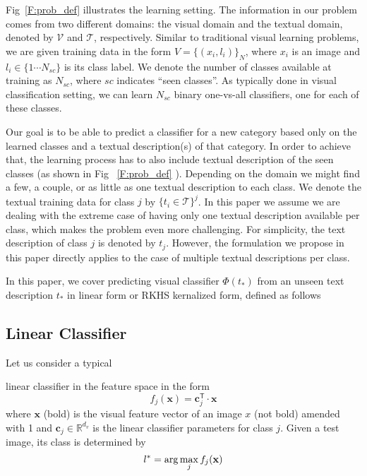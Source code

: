 

Fig~\ref{F:prob_def} illustrates the learning setting. 
The information in our problem comes from two different domains: the visual domain  and the textual domain, denoted by $\mathcal{V}$ and $\mathcal{T}$, respectively. Similar to traditional visual learning problems, we are given training data in the form $V=\{({x}_i , l_i)\}_{N}$, where $x_i$ is an image and $l_i \in \{1\cdots N_{sc}\}$ is its class label. We denote the number of classes available at training as $N_{sc}$, where $sc$ indicates ``seen classes''. As typically done in visual classification setting, we can learn $N_{sc}$ binary one-vs-all classifiers, one for each of these classes.  

Our goal is to be able to predict a classifier for a new category based only on the learned classes and a textual description(s) of that category. In order to achieve that, the learning process has to also include textual description of the seen classes (as shown in Fig ~\ref{F:prob_def} ). Depending on the domain we might find a few, a couple, or as little as one textual description to each class. We denote the textual training data for class $j$ by $\{t_i\in \mathcal{T} \}^j$. 
In this paper we assume we are dealing with the extreme case of having only one textual description available per class, which makes the problem even more challenging. For simplicity, the text description of class $j$ is denoted by $t_j$. However, the formulation we propose in this paper directly applies to the case of multiple textual descriptions per class.



In this paper, we cover predicting  visual classifier ${\Phi}(t_*)$ from an unseen text description $t_*$  in  linear form or RKHS kernalized form, defined as follows 


\subsection{Linear Classifier}
\label{sec_lin_pdef}
Let us consider a typical linear classifier in the feature space in the form
\[
    f_j(\mathbf{x}) = \mathbf{c}_j^\textsf{T} \cdot \mathbf{x}
\] 
where $\mathbf{x}$ (bold) is the visual feature vector of an image $x$ (not bold) amended with 1   and $\mathbf{c}_j \in \mathbb{R}^{d_v}$ is the linear classifier parameters for class $j$. Given a test image, its class is determined by
\begin{equation}
\small
l^* = \arg \max_j f_j(\mathbf{x})
\label{eq:mclass}
\end{equation}
  
